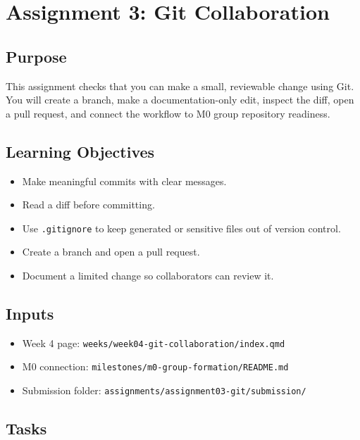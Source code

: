\documentclass[
  letterpaper,
  DIV=11,
  numbers=noendperiod,
  oneside]{scrreprt}
\providecommand{\tightlist}{%
  \setlength{\itemsep}{0pt}\setlength{\parskip}{0pt}}
\begin{document}
\chapter{Assignment 3: Git
Collaboration}\label{assignment-3-git-collaboration}

\section{Purpose}\label{purpose-5}

This assignment checks that you can make a small, reviewable change
using Git. You will create a branch, make a documentation-only edit,
inspect the diff, open a pull request, and connect the workflow to M0
group repository readiness.

\section{Learning Objectives}\label{learning-objectives-4}

\begin{itemize}
\tightlist
\item
  Make meaningful commits with clear messages.
\item
  Read a diff before committing.
\item
  Use \texttt{.gitignore} to keep generated or sensitive files out of
  version control.
\item
  Create a branch and open a pull request.
\item
  Document a limited change so collaborators can review it.
\end{itemize}

\section{Inputs}\label{inputs-4}

\begin{itemize}
\tightlist
\item
  Week 4 page: \texttt{weeks/week04-git-collaboration/index.qmd}
\item
  M0 connection: \texttt{milestones/m0-group-formation/README.md}
\item
  Submission folder: \texttt{assignments/assignment03-git/submission/}
\end{itemize}

\section{Tasks}\label{tasks-2}
\end{document}
